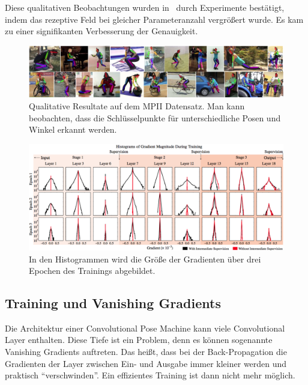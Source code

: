 \documentclass[journal, a4paper]{IEEEtran}
\begin{document}
        Diese qualitativen Beobachtungen wurden in~\cite{conv_pose} durch Experimente bestätigt, indem das rezeptive Feld bei gleicher Parameteranzahl vergrößert wurde. Es kam zu einer signifikanten Verbesserung der Genauigkeit.

\begin{figure}
        \includegraphics[width=2\columnwidth]{mpii_results.png}
        \caption{Qualitative Resultate auf dem MPII Datensatz. Man kann beobachten, dass die Schlüsselpunkte für unterschiedliche Posen und Winkel erkannt werden.~\cite{conv_pose}}
        \label{fig:mpii_results}
\end{figure}
\begin{figure}
        \includegraphics[width=2\columnwidth]{intermediate_supervision.png}
        \caption{In den Histogrammen wird die Größe der Gradienten über drei Epochen des Trainings abgebildet.~\cite{conv_pose}}
        \label{fig:intermediate_supervision}
\end{figure}

\subsection{Training und Vanishing Gradients} \label{subsec:vanishing_gradients}

        Die Architektur einer Convolutional Pose Machine kann viele Convolutional Layer enthalten. Diese Tiefe ist ein Problem, denn es können sogenannte Vanishing Gradients auftreten. Das heißt, dass bei der Back-Propagation die Gradienten der Layer zwischen Ein- und Ausgabe immer kleiner werden und praktisch "`verschwinden"'. Ein effizientes Training ist dann nicht mehr möglich.
\end{document}
